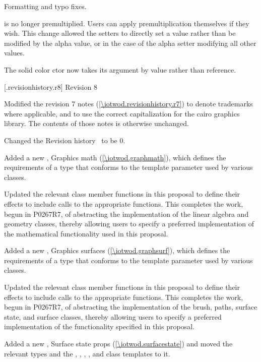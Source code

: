 \pnum
Formatting and typo fixes.

\pnum
{} is no longer premultiplied. Users can apply premultiplication themselves if they wish. This change allowed the setters to directly set a value rather than be modified by the alpha value, or in the case of the alpha setter modifying all other values.

\pnum
The solid color  ctor now takes its  argument by value rather than reference.

 [\iotwod.revisionhistory.r8] {Revision 8}

\pnum
Modified the revision 7 notes (\ref{\iotwod.revisionhistory.r7}) to denote trademarks where applicable, and to use the correct capitalization for the cairo graphics library. The contents of those notes is otherwise unchanged.

\pnum
Changed the Revision history \clause{}\, to be \clause{} 0.

\pnum
Added a new \clause, Graphics math (\ref{\iotwod.graphmath}), which defines the requirements of a type that conforms to the \graphicsmathtemplparam template parameter used by various classes.

\pnum
Updated the relevant class member functions in this proposal to define their effects to include calls to the appropriate \graphicsmathtemplparam functions. This completes the work, begun in P0267R7, of abstracting the implementation of the linear algebra and geometry classes, thereby allowing users to specify a preferred implementation of the mathematical functionality used in this proposal.

\pnum
Added a new \clause{}, Graphics surfaces (\ref{\iotwod.graphsurf}), which defines the requirements of a type that conforms to the \graphicssurfacestemplparam template parameter used by various classes.

\pnum
Updated the relevant class member functions in this proposal to define their effects to include calls to the appropriate \graphicssurfacestemplparam functions. This completes the work, begun in P0267R7, of abstracting the implementation of the brush, paths, surface state, and surface classes, thereby allowing users to specify a preferred implementation of the functionality specified in this proposal.

\pnum
Added a new \clause, Surface state props (\ref{\iotwod.surfacestate}) and moved the relevant  types and the , , , , and  class templates to it. 

